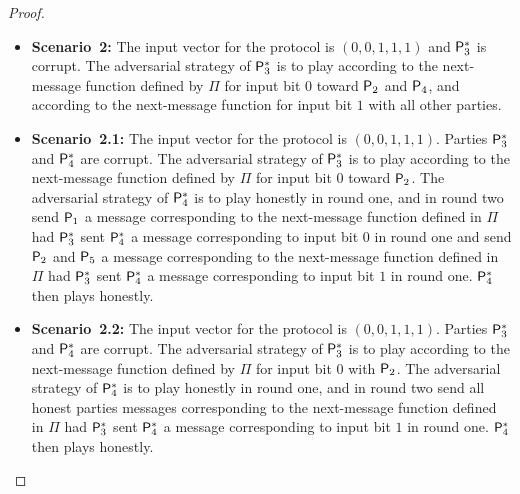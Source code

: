 \begin{proof}
\begin{itemize}
    \item\textbf{Scenario~2:}
	The input vector for the protocol is $(0,0,1,1,1)$ and $\mathsf{P}_3^\ast$ is corrupt. The adversarial strategy of $\mathsf{P}_3^\ast$ is to play according to the next-message function defined by $\Pi$ for input bit $0$ toward $\mathsf{P}_2$ and $\mathsf{P}_4$, and according to the next-message function for input bit $1$ with all other parties.
    \item\textbf{Scenario~2.1:}
	The input vector for the protocol is $(0,0,1,1,1)$. Parties $\mathsf{P}_3^\ast$ and $\mathsf{P}_4^\ast$ are corrupt. The adversarial strategy of  $\mathsf{P}_3^\ast$ is to play according to the next-message function defined by $\Pi$ for input bit $0$ toward $\mathsf{P}_2$. The adversarial strategy of $\mathsf{P}_4^\ast$ is to play honestly in round one, and in round two send $\mathsf{P}_1$ a message corresponding to the next-message function defined in $\Pi$ had $\mathsf{P}_3^\ast$ sent $\mathsf{P}_4^\ast$ a message corresponding to input bit $0$ in round one and send $\mathsf{P}_2$ and $\mathsf{P}_5$ a message corresponding to the next-message function defined in $\Pi$ had $\mathsf{P}_3^\ast$ sent $\mathsf{P}_4^\ast$ a message corresponding to input bit $1$ in round one. $\mathsf{P}_4^\ast$ then plays honestly. 
    \item\textbf{Scenario~2.2:}
	The input vector for the protocol is $(0,0,1,1,1)$. Parties $\mathsf{P}_3^\ast$ and $\mathsf{P}_4^\ast$ are corrupt. The adversarial strategy of  $\mathsf{P}_3^\ast$ is to play according to the next-message function defined by $\Pi$ for input bit $0$ with $\mathsf{P}_2$. The adversarial strategy of $\mathsf{P}_4^\ast$ is to play honestly in round one, and in round two send all honest parties messages corresponding to the next-message function defined in $\Pi$ had $\mathsf{P}_3^\ast$ sent $\mathsf{P}_4^\ast$ a message corresponding to input bit $1$ in round one. $\mathsf{P}_4^\ast$ then plays honestly. 
\end{itemize}	

\end{proof}
